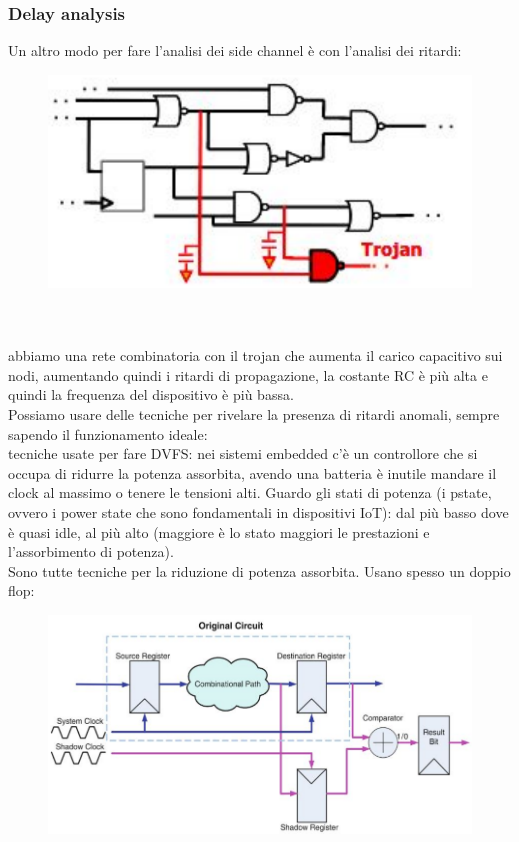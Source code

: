 \documentclass[oneside, 12pt]{extbook}
\begin{document}
\subsubsection{Delay analysis}
Un altro modo per fare l'analisi dei side channel è con l'analisi dei ritardi:\\
\begin{figure}[!h]
	\includegraphics[scale=0.4]{immagini/hardware/delay.png}
\end{figure}
\\\\abbiamo una rete combinatoria con il trojan che aumenta il carico capacitivo sui nodi, aumentando quindi i ritardi di propagazione, la costante RC è più alta e quindi la frequenza del dispositivo è più bassa.
\\Possiamo usare delle tecniche per rivelare la presenza di ritardi anomali, sempre sapendo il funzionamento ideale:
\\tecniche usate per fare DVFS: nei sistemi embedded c'è un controllore che si occupa di ridurre la potenza assorbita, avendo una batteria è inutile mandare il clock al massimo o tenere le tensioni alti. Guardo gli stati di potenza (i pstate, ovvero i power state che sono fondamentali in dispositivi IoT): dal più basso dove è quasi idle, al più alto (maggiore è lo stato maggiori le prestazioni e l'assorbimento di potenza).
\\Sono tutte tecniche per la riduzione di potenza assorbita. Usano spesso un doppio flop:\\
\begin{figure}[!h]
	\includegraphics[scale=0.3]{immagini/hardware/circuito.png}
\end{figure}
\end{document}

